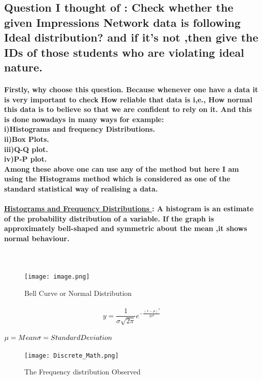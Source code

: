 \documentclass{article}
\begin{document}
\subsection*{Question I thought of : Check whether the given Impressions Network data is following Ideal distribution? and if it's not ,then give the IDs of those students who are violating ideal nature.}
\paragraph{Firstly, why choose this question. Because whenever one have a data it is very important to check How reliable that data is i,e., How normal this data is to believe so that we are confident to rely on it. And this is done nowadays in many ways for example:\\i)Histograms and frequency Distributions. \\ii)Box Plots. \\iii)Q-Q plot. \\iv)P-P plot.\\ Among these above one can use any of the method but here I am using the Histograms method which is considered as one of the standard statistical way of realising a data. \\ \\ \underline{Histograms and Frequency Distributions }: A histogram is an estimate of the probability distribution of a variable. If the graph is approximately bell-shaped and symmetric about the mean ,it shows normal behaviour.}
\paragraph{\\}
\begin{figure}[h]
  \centering
  \texttt{[image: image.png]}
  \caption{Bell Curve or Normal Distribution}
\end{figure}

\paragraph{{\Large
\[ y = \dfrac{1}{\sigma\sqrt{2\pi}} e^{-\frac{(x-\mu)^{2}}{2\sigma^{2}}} \]
}\\ $\mu = Mean \\ \sigma = Standard Deviation $}
 \begin{figure}
    \centering
    \texttt{[image: Discrete\_Math.png]}
    \caption{The Frequency distribution Observed }
    \label{fig:enter-label}
\end{figure} 
\end{document}
